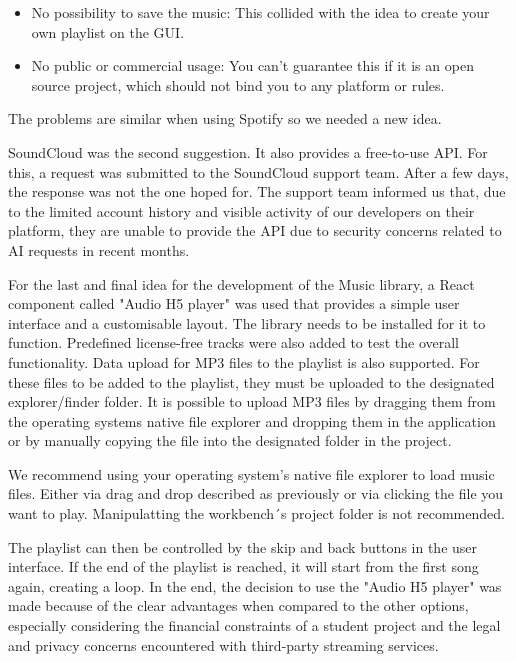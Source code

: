 \documentclass[a4paper,12pt]{article}
\begin{document}
\begin{itemize}
  \item No possibility to save the music: This collided with the idea to create your own playlist on the GUI.
  \item No public or commercial usage: You can’t guarantee this if it is an open source project, which should not bind you to any platform or rules.
\end{itemize}
The problems are similar when using Spotify so we needed a new idea.

SoundCloud was the second suggestion. 
It also provides a free-to-use API. For this, a request was submitted to the SoundCloud support team. 
After a few days, the response was not the one hoped for. 
The support team informed us that, due to the limited account history and visible activity of our developers on their platform, they are unable to provide the API due to security concerns related to AI requests in recent months. 

For the last and final idea for the development of the Music library, a React component called "Audio H5 player" was used that provides a simple user interface and a customisable layout. 
The library needs to be installed for it to function. Predefined license-free tracks were also added to test the overall functionality. 
Data upload for MP3 files to the playlist is also supported. 
For these files to be added to the playlist, they must be uploaded to the designated explorer/finder folder. 
It is possible to upload MP3 files by dragging them from the operating systems native file explorer and dropping them in the application or by manually copying the file into the designated folder in the project. 

\begin{notebox}
We recommend using your operating system’s native file explorer to load music files. 
Either via drag and drop described as previously or via clicking the file you want to play.
Manipulatting the workbench´s project folder is not recommended. 
\end{notebox}

The playlist can then be controlled by the skip and back buttons in the user interface. 
If the end of the playlist is reached, it will start from the first song again, creating a loop. 
In the end, the decision to use the "Audio H5 player"\cite{Audio H5 Player} was made because of the clear advantages when compared to the other options, especially considering the financial constraints of a student project and the legal and privacy concerns encountered with third-party streaming services.
\end{document}
